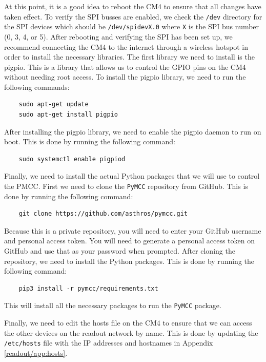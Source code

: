 At this point, it is a good idea to reboot the CM4 to ensure that all changes have taken effect.
To verify the SPI busses are enabled, we check the \texttt{/dev} directory for the SPI devices which should be \texttt{/dev/spidevX.0} where \texttt{X} is the SPI bus number (0, 3, 4, or 5).
After rebooting and verifying the SPI has been set up, we recommend connecting the CM4 to the internet through a wireless hotspot in order to install the necessary libraries.
The first library we need to install is the pigpio.
This is a library that allows us to control the GPIO pins on the CM4 without needing root access.
To install the pigpio library, we need to run the following commands:
\begin{verbatim}
    sudo apt-get update
    sudo apt-get install pigpio
\end{verbatim}
After installing the pigpio library, we need to enable the pigpio daemon to run on boot.
This is done by running the following command:
\begin{verbatim}
    sudo systemctl enable pigpiod
\end{verbatim}

Finally, we need to install the actual Python packages that we will use to control the PMCC.
First we need to clone the \texttt{PyMCC} repository from GitHub.
This is done by running the following command:
\begin{verbatim}
    git clone https://github.com/asthros/pymcc.git
\end{verbatim}
Because this is a private repository, you will need to enter your GitHub username and personal access token.
You will need to generate a personal access token on GitHub and use that as your password when prompted.
After cloning the repository, we need to install the Python packages.
This is done by running the following command:
\begin{verbatim}
    pip3 install -r pymcc/requirements.txt
\end{verbatim}
This will install all the necessary packages to run the \texttt{PyMCC} package.

Finally, we need to edit the hosts file on the CM4 to ensure that we can access the other devices on the readout network by name.
This is done by updating the \texttt{/etc/hosts} file with the IP addresses and hostnames in Appendix \ref{readout/app:hosts}.


